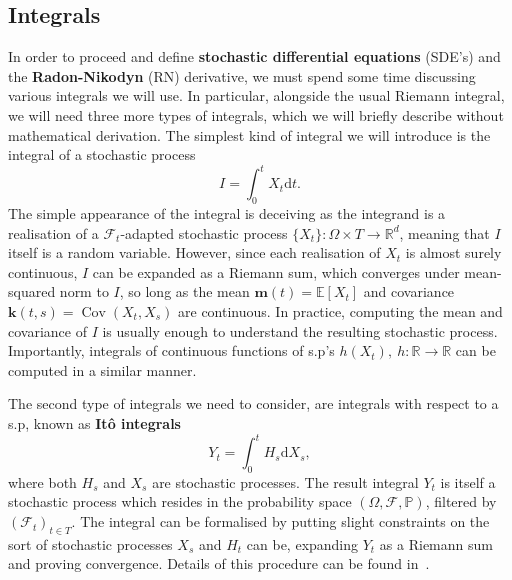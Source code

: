 \subsection{Integrals}
In order to proceed and define \textbf{stochastic differential equations} (SDE's) and the \textbf{Radon-Nikodyn} (RN) derivative, we must spend some time discussing various integrals we will use. In particular, alongside the usual Riemann integral, we will need three more types of integrals, which we will briefly describe without mathematical derivation. The simplest kind of integral we will introduce is the integral of a stochastic process
\begin{equation}
	I = \int_{0}^{t} X_t \mathrm{d}t.
\end{equation}
The simple appearance of the integral is deceiving as the integrand is a realisation of a $\mathcal{F}_t$-adapted stochastic process $\{X_t\}: \Omega \times T \rightarrow \mathbb{R}^{d}$, meaning that $I$ itself is a random variable. However, since each realisation of $X_t$ is almost surely continuous, $I$ can be expanded as a Riemann sum, which converges under mean-squared norm to $I$, so long as the mean $\mathbf{m}(t) = \mathbb{E}[X_t]$ and covariance $\textbf{k}(t,s) = \operatorname{Cov}(X_t, X_s)$ are continuous. In practice, computing the mean and covariance of $I$ is usually enough to understand the resulting stochastic process. Importantly, integrals of continuous functions of s.p's $h(X_t),~ h: \mathbb{R} \rightarrow \mathbb{R}$ can be computed in a similar manner.

The second type of integrals we need to consider, are integrals with respect to a s.p, known as \textbf{It\^ o integrals}
\begin{equation}
	\label{eq:ito}
	Y_t = \int_{0}^{t} H_s \mathrm{d}X_s,
\end{equation}
where both $H_s$ and $X_s$ are stochastic processes. The result integral $Y_t$ is itself a stochastic process which resides in the probability space $(\Omega, \mathcal{F}, \mathbb{P})$, filtered by $\left(\mathcal{F}_t\right)_{t\in T}$. The integral can be formalised by putting slight constraints on the sort of stochastic processes $X_s$ and $H_t$ can be, expanding $Y_t$ as a Riemann sum and proving convergence. Details of this procedure can be found in~\cite{rogers2000diffusions}.


